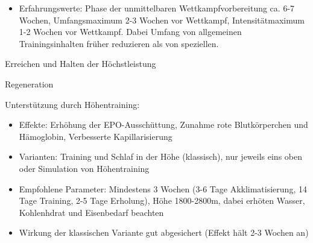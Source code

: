 \begin{minipage}{0.65\textwidth}
\begin{description}
\item
    \begin{itemize}
        \item Erfahrungswerte: Phase der unmittelbaren Wettkampfvorbereitung ca. 6-7 Wochen, Umfangsmaximum 2-3 Wochen vor Wettkampf, Intensitätmaximum 1-2 Wochen vor Wettkampf. Dabei Umfang von allgemeinen Trainingsinhalten früher reduzieren als von speziellen.
    \end{itemize}
    \item [Wettkampfzyklus] Erreichen und Halten der Höchstleistung
    \item [Regenerationszyklus] Regeneration
\end{description}

Unterstützung durch Höhentraining:
\begin{itemize}
    \item Effekte: Erhöhung der EPO-Ausschüttung, Zunahme rote Blutkörperchen und Hämoglobin, Verbesserte Kapillarisierung
    \item Varianten: Training und Schlaf in der Höhe (klassisch), nur jeweils eins oben oder Simulation von Höhentraining
    \item Empfohlene Parameter: Mindestens 3 Wochen (3-6 Tage Akklimatisierung, 14 Tage Training, 2-5 Tage Erholung), Höhe 1800-2800m, dabei erhöten Wasser, Kohlenhdrat und Eisenbedarf beachten
    \item Wirkung der klassischen Variante gut abgesichert (Effekt hält 2-3 Wochen an)
\end{itemize}
\end{minipage}
